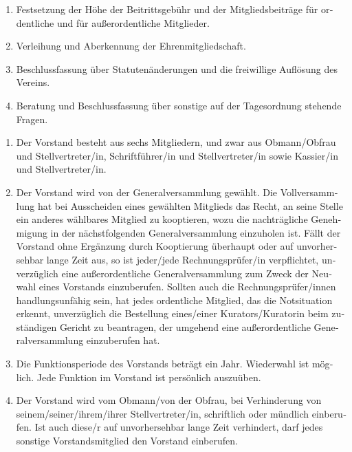 \begin{otherlanguage}{german}
\begin{enumerate}[statutenenum]
    \item Festsetzung der Höhe der Beitrittsgebühr und der Mitgliedsbeiträge für ordentliche und für außerordentliche Mitglieder.

    \item Verleihung und Aberkennung der Ehrenmitgliedschaft.

    \item Beschlussfassung über Statutenänderungen und die freiwillige Auflösung des Vereins.

    \item Beratung und Beschlussfassung über sonstige auf der Tagesordnung stehende Fragen.
\end{enumerate}


\begin{enumerate}[statutenenum]
    \item Der Vorstand besteht aus sechs Mitgliedern, und zwar aus Obmann/Obfrau und Stellvertreter/in, Schriftführer/in und Stellvertreter/in sowie Kassier/in und Stellvertreter/in.

    \item Der Vorstand wird von der Generalversammlung gewählt.
        Die Vollversammlung hat bei Ausscheiden eines gewählten Mitglieds das Recht, an seine Stelle ein anderes wählbares Mitglied zu kooptieren, wozu die nachträgliche Genehmigung in der nächstfolgenden Generalversammlung einzuholen ist.
        Fällt der Vorstand ohne Ergänzung durch Kooptierung überhaupt oder auf unvorhersehbar lange Zeit aus, so ist jeder/jede Rechnungsprüfer/in verpflichtet, unverzüglich eine außerordentliche Generalversammlung zum Zweck der Neuwahl eines Vorstands einzuberufen.
        Sollten auch die Rechnungsprüfer/innen handlungsunfähig sein, hat jedes ordentliche Mitglied, das die Notsituation erkennt, unverzüglich die Bestellung eines/einer Kurators/Kuratorin beim zuständigen Gericht zu beantragen, der umgehend eine außerordentliche Generalversammlung einzuberufen hat.

    \item Die Funktionsperiode des Vorstands beträgt ein Jahr.
        Wiederwahl ist möglich.
        Jede Funktion im Vorstand ist persönlich auszuüben.

    \item Der Vorstand wird vom Obmann/von der Obfrau, bei Verhinderung von seinem/seiner/ihrem/ihrer Stellvertreter/in, schriftlich oder mündlich einberufen.
        Ist auch diese/r auf unvorhersehbar lange Zeit verhindert, darf jedes sonstige Vorstandsmitglied den Vorstand einberufen.


\end{enumerate}
\end{otherlanguage}
